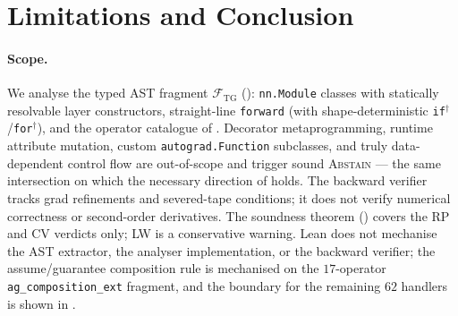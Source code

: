 \section{Limitations and Conclusion}\label{sec:limconc}

\paragraph{Scope.} We analyse the typed AST fragment
$\mathcal{F}_{\mathrm{TG}}$ ():
\texttt{nn.Module} classes with statically resolvable layer
constructors, straight-line \texttt{forward} (with
shape-deterministic \texttt{if}$^\dagger$/\texttt{for}$^\dagger$),
and the operator catalogue of .
Decorator metaprogramming, runtime attribute mutation, custom
\texttt{autograd.Function} subclasses, and truly data-dependent
control flow are out-of-scope and trigger sound
\textsc{Abstain} --- the same intersection on which the
necessary direction of  holds. The
backward verifier tracks grad refinements and severed-tape
conditions; it does not verify numerical correctness or
second-order derivatives. The soundness theorem
() covers the \textsc{RP} and \textsc{CV}
verdicts only; \textsc{LW} is a conservative warning.
Lean does not mechanise the AST extractor, the analyser
implementation, or the backward verifier; the assume/guarantee
composition rule is mechanised on the $17$-operator
\texttt{ag\_composition\_ext} fragment, and the boundary for the
remaining $62$ handlers is shown in
.

